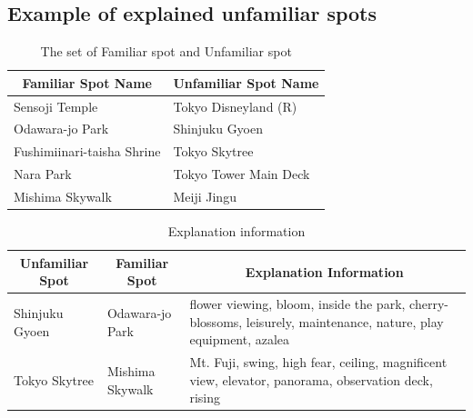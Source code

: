 \documentclass[journal]{IAENGtran}
\begin{document}
\subsection{Example of explained unfamiliar spots}
\label{subsec:Example of explained unfamiliar spots}

\begin{table}[t]
  \caption{The set of Familiar spot and Unfamiliar spot}
  \label{table:Familiar spot group and Unfamiliar spot group}
  \centering
  \begin{tabular}{l|l}
  \hline
  \multicolumn{1}{c|}{Familiar Spot Name} & \multicolumn{1}{c}{Unfamiliar Spot Name} \\ \hline
  Sensoji Temple                          & Tokyo Disneyland (R)                     \\
  Odawara-jo Park                         & Shinjuku Gyoen                           \\
  Fushimiinari-taisha Shrine              & Tokyo Skytree                            \\
  Nara Park                               & Tokyo Tower Main Deck            \\
  Mishima Skywalk                         & Meiji Jingu                              \\ \hline
  \end{tabular}
\end{table}

\begin{table}[t]
  \caption{Explanation information}
  \label{table:Explanation information}
  \centering
  \begin{tabular}{l|l|l}
  \hline
  \multicolumn{1}{c|}{Unfamiliar Spot} & \multicolumn{1}{c|}{Familiar Spot} & \multicolumn{1}{c}{Explanation Information}                     \\ \hline
  Shinjuku Gyoen                      & Odawara-jo Park                         & flower viewing, bloom, inside the park, cherry-blossoms, leisurely, maintenance, nature, play equipment, azalea          \\
  Tokyo Skytree                     & Mishima Skywalk                    & Mt. Fuji, swing, high fear, ceiling, magnificent view, elevator, panorama, observation deck, rising
 \\ \hline
  \end{tabular}
\end{table}
\end{document}
